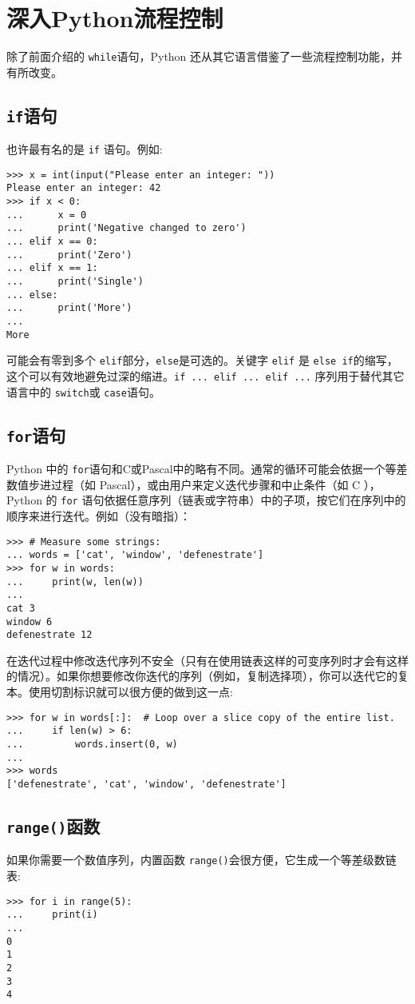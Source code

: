 \chapter{深入Python流程控制\label{ControlFlowTools}}
除了前面介绍的 \texttt{while}语句，Python 还从其它语言借鉴了一些流程控制功能，并有所改变。
\section{\texttt{if}语句}
也许最有名的是 \texttt{if} 语句。例如:
\begin{lstlisting}
>>> x = int(input("Please enter an integer: "))
Please enter an integer: 42
>>> if x < 0:
...      x = 0
...      print('Negative changed to zero')
... elif x == 0:
...      print('Zero')
... elif x == 1:
...      print('Single')
... else:
...      print('More')
...
More
\end{lstlisting}
可能会有零到多个 \texttt{elif}部分，\texttt{else}是可选的。关键字 \texttt{elif} 是 \texttt{else if}的缩写，这个可以有效地避免过深的缩进。\texttt{if ... elif ... elif ...} 序列用于替代其它语言中的 \texttt{switch}或 \texttt{case}语句。
\section{\texttt{for}语句}
Python 中的 \texttt{for}语句和C或Pascal中的略有不同。通常的循环可能会依据一个等差数值步进过程（如 Pascal），或由用户来定义迭代步骤和中止条件（如 C ），Python 的 \texttt{for} 语句依据任意序列（链表或字符串）中的子项，按它们在序列中的顺序来进行迭代。例如（没有暗指）：
\begin{lstlisting}
>>> # Measure some strings:
... words = ['cat', 'window', 'defenestrate']
>>> for w in words:
...     print(w, len(w))
...
cat 3
window 6
defenestrate 12
\end{lstlisting}
在迭代过程中修改迭代序列不安全（只有在使用链表这样的可变序列时才会有这样的情况）。如果你想要修改你迭代的序列（例如，复制选择项），你可以迭代它的复本。使用切割标识就可以很方便的做到这一点:
\begin{lstlisting}
>>> for w in words[:]:  # Loop over a slice copy of the entire list.
...     if len(w) > 6:
...         words.insert(0, w)
...
>>> words
['defenestrate', 'cat', 'window', 'defenestrate']
\end{lstlisting}
\section{\texttt{range()}函数}
如果你需要一个数值序列，内置函数 \texttt{range()}会很方便，它生成一个等差级数链表:
\begin{lstlisting}
>>> for i in range(5):
...     print(i)
...
0
1
2
3
4
\end{lstlisting}

